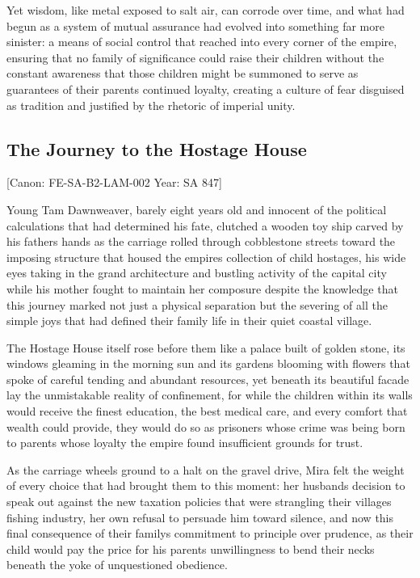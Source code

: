 Yet wisdom, like metal exposed to salt air, can corrode over time, and
what had begun as a system of mutual assurance had evolved into
something far more sinister: a means of social control that reached into
every corner of the empire, ensuring that no family of significance
could raise their children without the constant awareness that those
children might be summoned to serve as guarantees of their
parents\textquotesingle{} continued loyalty, creating a culture of fear
disguised as tradition and justified by the rhetoric of imperial unity.

\subsection{The Journey to the Hostage
House}\label{the-journey-to-the-hostage-house}

{[}Canon: FE-SA-B2-LAM-002 \textbar{} Year: SA 847{]}

Young Tam Dawnweaver, barely eight years old and innocent of the
political calculations that had determined his fate, clutched a wooden
toy ship carved by his father\textquotesingle s hands as the carriage
rolled through cobblestone streets toward the imposing structure that
housed the empire\textquotesingle s collection of child hostages, his
wide eyes taking in the grand architecture and bustling activity of the
capital city while his mother fought to maintain her composure despite
the knowledge that this journey marked not just a physical separation
but the severing of all the simple joys that had defined their family
life in their quiet coastal village.

The Hostage House itself rose before them like a palace built of golden
stone, its windows gleaming in the morning sun and its gardens blooming
with flowers that spoke of careful tending and abundant resources, yet
beneath its beautiful facade lay the unmistakable reality of
confinement, for while the children within its walls would receive the
finest education, the best medical care, and every comfort that wealth
could provide, they would do so as prisoners whose crime was being born
to parents whose loyalty the empire found insufficient grounds for
trust.

As the carriage wheels ground to a halt on the gravel drive, Mira felt
the weight of every choice that had brought them to this moment: her
husband\textquotesingle s decision to speak out against the new taxation
policies that were strangling their village\textquotesingle s fishing
industry, her own refusal to persuade him toward silence, and now this
final consequence of their family\textquotesingle s commitment to
principle over prudence, as their child would pay the price for his
parents\textquotesingle{} unwillingness to bend their necks beneath the
yoke of unquestioned obedience.

